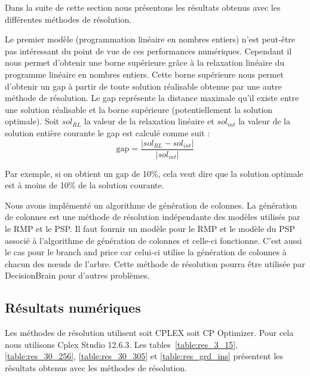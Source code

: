 

Dans la suite de cette section nous présentons les résultats obtenus avec les différentes méthodes de résolution.

Le premier modèle (programmation linéaire en nombres entiers) n'est peut-être pas intéressant du point de vue de ces performances numériques.
Cependant il nous permet d'obtenir une borne supérieure grâce à la relaxation linéaire du programme linéaire en nombres entiers.
Cette borne supérieure nous permet d'obtenir un gap à partir de toute solution réalisable obtenue par une autre méthode de résolution.
Le gap représente la distance maximale qu'il existe entre une solution réalisable et la borne supérieure (potentiellement la solution optimale).
Soit $sol_{RL}$ la valeur de la relaxation linéaire et $sol_{int}$ la valeur de la solution entière courante le gap est calculé comme suit :
$$
\text{gap} = \frac{|sol_{RL} - sol_{int}|}{|sol_{int}|}
$$

Par exemple, si on obtient un gap de 10\%, cela veut dire que la solution optimale est à moins de 10\% de la solution courante.

Nous avons implémenté un algorithme de génération de colonnes.
La génération de colonnes est une méthode de résolution indépendante des modèles utilisés par le RMP et le PSP.
Il faut fournir un modèle pour le RMP et le modèle du PSP associé à l'algorithme de génération de colonnes et celle-ci fonctionne.
C'est aussi le cas pour le branch and price car celui-ci utilise la génération de colonnes à chacun des n\oe uds de l'arbre.
Cette méthode de résolution pourra être utilisée par DecisionBrain pour d'autres problèmes.





\subsection{Résultats numériques}
Les méthodes de résolution utilisent soit CPLEX soit CP Optimizer.
Pour cela nous utilisons Cplex Studio 12.6.3.
Les tables~\ref{table:res_3_15}, \ref{table:res_30_256}, \ref{table:res_30_305} et \ref{table:res_grd_ins} présentent les résultats obtenus avec les méthodes de résolution.

